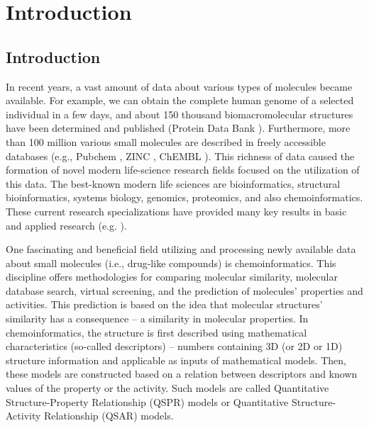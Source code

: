 \part{Introduction}

\chapter{Introduction}

In recent years, a vast amount of data about various types of molecules became
available. For example, we can obtain the complete human genome of a selected
individual in a few days, and about 150 thousand biomacromolecular structures
have been determined and published (Protein Data Bank \cite{Berman2014}).
Furthermore, more
than 100 million various small molecules are described in freely accessible
databases (e.g., Pubchem \cite{pubchem}, ZINC \cite{Irwin2012},
ChEMBL \cite{Bento2013}). This richness of data caused
the formation of novel modern life-science research fields focused on the
utilization of this data. The best-known modern life sciences are
bioinformatics, structural bioinformatics, systems biology, genomics,
proteomics, and also chemoinformatics. These current research specializations
have provided many key results in basic and applied research (e.g.
\cite{Paulsen2015, Cao2013, Prota2013, Lu2005, Puente2011, Nayal2006, Xie2009}
).

One fascinating and beneficial field utilizing and processing newly available
data about small molecules (i.e., drug-like compounds) is chemoinformatics.
This discipline offers me\-tho\-do\-lo\-gies for comparing molecular similarity,
molecular database search, virtual screening, and the prediction of molecules'
properties and activities. This prediction is based on the idea that molecular
structures' similarity has a consequence -- a similarity in molecular
properties. In chemoinformatics, the structure is first described using
mathematical characteristics (so-called descriptors) -- numbers containing 3D
(or 2D or 1D) structure information and applicable as inputs of mathematical
models. Then, these models are constructed based on a relation between
descriptors and known values of the property or the activity. Such models are
called Quantitative Structure-Property Relationship (QSPR) models or
Quantitative Structure-Activity Relationship (QSAR) models.

